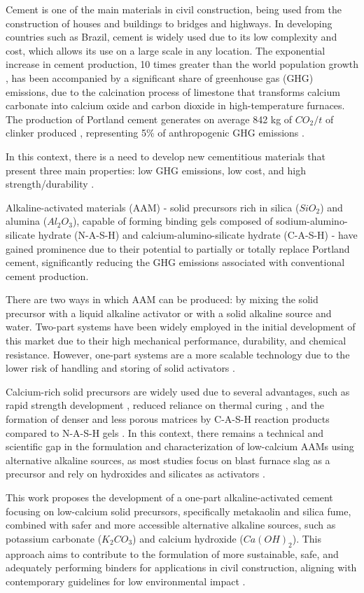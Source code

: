 Cement is one of the main materials in civil construction, being used from the construction of houses and buildings to bridges and highways.
In developing countries such as Brazil, cement is widely used due to its low complexity and cost, which allows its use on a large scale in any location.
The exponential increase in cement production, 10 times greater than the world population growth \cite{united1995world}, has been accompanied by a significant share of greenhouse gas (GHG) emissions, due to the calcination process of limestone that transforms calcium carbonate into calcium oxide and carbon dioxide in high-temperature furnaces.
The production of Portland cement generates on average 842 kg of $CO_2/t$ of clinker produced \cite{andrew2018global}, representing 5\% of anthropogenic GHG emissions \cite{IEA_WBCSD_2009}.

In this context, there is a need to develop new cementitious materials that present three main properties: low GHG emissions, low cost, and high strength/durability \cite{scrivener2018eco}.

Alkaline-activated materials (AAM) - solid precursors rich in silica ($SiO_2$) and alumina ($Al_2O_3$), capable of forming binding gels composed of sodium-alumino-silicate hydrate (N-A-S-H) and calcium-alumino-silicate hydrate (C-A-S-H) - have gained prominence due to their potential to partially or totally replace Portland cement, significantly reducing the GHG emissions associated with conventional cement production.

There are two ways in which AAM can be produced: by mixing the solid precursor with a liquid alkaline activator or with a solid alkaline source and water.
Two-part systems have been widely employed in the initial development of this market due to their high mechanical performance, durability, and chemical resistance.
However, one-part systems are a more scalable technology due to the lower risk of handling and storing of solid activators \cite{provis2018alkali}.

Calcium-rich solid precursors are widely used due to several advantages, such as rapid strength development \cite{provis2014geopolymers}, reduced reliance on thermal curing \cite{ke2021one}, and the formation of denser and less porous matrices by C-A-S-H reaction products compared to N-A-S-H gels \cite{bernal2014engineering}.
In this context, there remains a technical and scientific gap in the formulation and characterization of low-calcium AAMs using alternative alkaline sources, as most studies focus on blast furnace slag as a precursor and rely on hydroxides and silicates as activators \cite{zareechian2023advancements}.

This work proposes the development of a one-part alkaline-activated cement focusing on low-calcium solid precursors, specifically metakaolin and silica fume, combined with safer and more accessible alternative alkaline sources, such as potassium carbonate ($K_2CO_3$) and calcium hydroxide ($Ca(OH)_2$).
This approach aims to contribute to the formulation of more sustainable, safe, and adequately performing binders for applications in civil construction, aligning with contemporary guidelines for low environmental impact \cite{PNRS2016}.